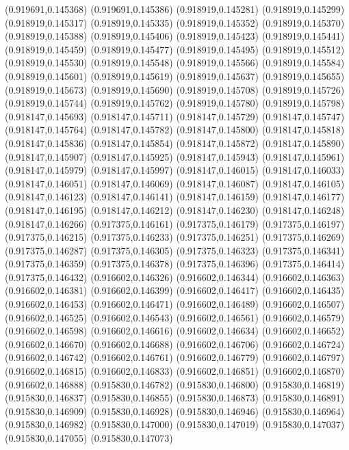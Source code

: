 (0.919691,0.145368)
(0.919691,0.145386)
(0.918919,0.145281)
(0.918919,0.145299)
(0.918919,0.145317)
(0.918919,0.145335)
(0.918919,0.145352)
(0.918919,0.145370)
(0.918919,0.145388)
(0.918919,0.145406)
(0.918919,0.145423)
(0.918919,0.145441)
(0.918919,0.145459)
(0.918919,0.145477)
(0.918919,0.145495)
(0.918919,0.145512)
(0.918919,0.145530)
(0.918919,0.145548)
(0.918919,0.145566)
(0.918919,0.145584)
(0.918919,0.145601)
(0.918919,0.145619)
(0.918919,0.145637)
(0.918919,0.145655)
(0.918919,0.145673)
(0.918919,0.145690)
(0.918919,0.145708)
(0.918919,0.145726)
(0.918919,0.145744)
(0.918919,0.145762)
(0.918919,0.145780)
(0.918919,0.145798)
(0.918147,0.145693)
(0.918147,0.145711)
(0.918147,0.145729)
(0.918147,0.145747)
(0.918147,0.145764)
(0.918147,0.145782)
(0.918147,0.145800)
(0.918147,0.145818)
(0.918147,0.145836)
(0.918147,0.145854)
(0.918147,0.145872)
(0.918147,0.145890)
(0.918147,0.145907)
(0.918147,0.145925)
(0.918147,0.145943)
(0.918147,0.145961)
(0.918147,0.145979)
(0.918147,0.145997)
(0.918147,0.146015)
(0.918147,0.146033)
(0.918147,0.146051)
(0.918147,0.146069)
(0.918147,0.146087)
(0.918147,0.146105)
(0.918147,0.146123)
(0.918147,0.146141)
(0.918147,0.146159)
(0.918147,0.146177)
(0.918147,0.146195)
(0.918147,0.146212)
(0.918147,0.146230)
(0.918147,0.146248)
(0.918147,0.146266)
(0.917375,0.146161)
(0.917375,0.146179)
(0.917375,0.146197)
(0.917375,0.146215)
(0.917375,0.146233)
(0.917375,0.146251)
(0.917375,0.146269)
(0.917375,0.146287)
(0.917375,0.146305)
(0.917375,0.146323)
(0.917375,0.146341)
(0.917375,0.146359)
(0.917375,0.146378)
(0.917375,0.146396)
(0.917375,0.146414)
(0.917375,0.146432)
(0.916602,0.146326)
(0.916602,0.146344)
(0.916602,0.146363)
(0.916602,0.146381)
(0.916602,0.146399)
(0.916602,0.146417)
(0.916602,0.146435)
(0.916602,0.146453)
(0.916602,0.146471)
(0.916602,0.146489)
(0.916602,0.146507)
(0.916602,0.146525)
(0.916602,0.146543)
(0.916602,0.146561)
(0.916602,0.146579)
(0.916602,0.146598)
(0.916602,0.146616)
(0.916602,0.146634)
(0.916602,0.146652)
(0.916602,0.146670)
(0.916602,0.146688)
(0.916602,0.146706)
(0.916602,0.146724)
(0.916602,0.146742)
(0.916602,0.146761)
(0.916602,0.146779)
(0.916602,0.146797)
(0.916602,0.146815)
(0.916602,0.146833)
(0.916602,0.146851)
(0.916602,0.146870)
(0.916602,0.146888)
(0.915830,0.146782)
(0.915830,0.146800)
(0.915830,0.146819)
(0.915830,0.146837)
(0.915830,0.146855)
(0.915830,0.146873)
(0.915830,0.146891)
(0.915830,0.146909)
(0.915830,0.146928)
(0.915830,0.146946)
(0.915830,0.146964)
(0.915830,0.146982)
(0.915830,0.147000)
(0.915830,0.147019)
(0.915830,0.147037)
(0.915830,0.147055)
(0.915830,0.147073)
